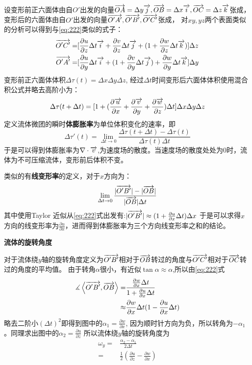 设变形前正六面体由自$O'$出发的向量$\overrightarrow{OA}=\Delta y\overrightarrow{j},\overrightarrow{OB}=\Delta x \overrightarrow{i},\overrightarrow{OC}=\Delta z \overrightarrow{k}$张成，
变形后的六面体由自$O'$出发的向量$\overrightarrow{O'A'},\overrightarrow{O'B'},\overrightarrow{O'C'}$张成，
对$xy,yz$两个表面类似的分析可以得到与\eqref{eq:222}类似的式子：
\begin{align*}
\overrightarrow{O'C'}=&[\frac{\partial u}{\partial z}\Delta t\overrightarrow{i}+\frac{\partial v}{\partial z}\Delta t\overrightarrow{j}+(1+\frac{\partial w}{\partial z}\Delta t\overrightarrow{k})]\Delta z\\
\overrightarrow{O'A'}=&[\frac{\partial u}{\partial y}\Delta t\overrightarrow{i}+(1+\frac{\partial v}{\partial y}\Delta t\overrightarrow{j})+\frac{\partial w}{\partial y}\Delta t\overrightarrow{k}]\Delta y
\end{align*}
变形前正六面体体积$\Delta \tau (t)=\Delta x\Delta y\Delta z$,
经过$\Delta t$时间变形后六面体体积使用混合积公式\cite{mixedProduct}并略去高阶小为：
\begin{equation}
\Delta \tau (t+\Delta t)=[1+(\frac{\partial \overrightarrow{u}}{\partial x}+\frac{\partial \overrightarrow{v}}{\partial y}+\frac{\partial \overrightarrow{w}}{\partial z})\Delta t]\Delta x\Delta y\Delta z
\end{equation}
定义流体微团的瞬时\textbf{体膨胀率}为单位体积变化的速率，即
\begin{equation}
\Delta \tau'(t)=\lim_{\Delta t \to 0} \frac{\Delta \tau (t+\Delta t)-\Delta \tau (t)}{\Delta \tau (t)\Delta t}
\end{equation}
于是可以得到体膨胀率为$\nabla \cdot \overrightarrow{v}$,为速度场的散度。当速度场的散度处处为0时，流体为不可压缩流体，变形前后体积不变。

类似的有\textbf{线变形率}的定义，对于$x$方向为：
\begin{equation}
\lim_{\Delta t \to 0} \frac{|\overrightarrow{O'B'}|-|\overrightarrow{OB}|}{|\overrightarrow{OB}|\Delta t}
\end{equation}
其中使用Taylor 近似从\eqref{eq:222}式出发有:$|\overrightarrow{O'B'}|\approx (1+\frac{\partial u}{\partial x}\Delta t)\Delta x$
于是可以求得$x$方向的线变形率为$\frac{\partial u}{\partial x}$，进而得到体膨胀率为三个方向线变形率之和的结论。


\textbf{流体的旋转角度}

对于流体绕$y$轴的旋转角度定义为$\overrightarrow{O'B'}$相对于$\overrightarrow{OB}$转过的角度与$\overrightarrow{O'C'}$相对于$\overrightarrow{OC}$转过的角度的平均值。
由于转角$\alpha$很小，有近似$\tan \alpha\approx \alpha$,所以由\eqref{eq:222}式
\begin{align*}
\measuredangle \left< \overrightarrow{O'B'},\overrightarrow{OB} \right>=&\frac{\frac{\partial w}{\partial x}\Delta t}{1+\frac{\partial u}{\partial x}\Delta t}\\
\approx & \frac{\partial w}{\partial x}\Delta t (1-\frac{\partial u}{\partial x}\Delta t)
\end{align*}
略去二阶小$(\Delta t)^2$即得到图中的$\alpha_1=\frac{\partial w}{\partial x}$,
因为顺时针方向为负，所以转角为$-\alpha_1$。同理求出图中的$\alpha_2=\frac{\partial u}{\partial z}$
所以流体绕$y$轴的旋转角度为
\begin{align}
\omega_y=&\frac{\alpha_2-\alpha_1}{2\Delta t}\nonumber\\
=&\frac{1}{2}(\frac{\partial u}{\partial z}-\frac{\partial w}{\partial x})
\end{align}

